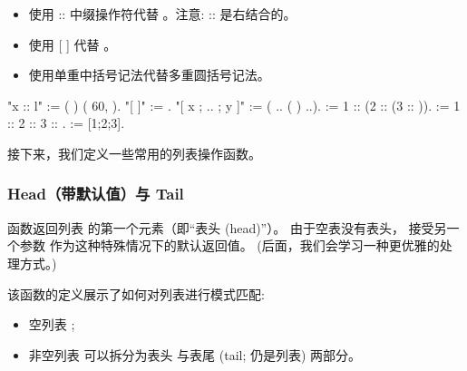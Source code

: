 \documentclass[12pt]{report}
\begin{document}
{{{\begin{itemize}
\item  使用 :: 中缀操作符代替 。注意: :: 是右结合的。

\item  使用 [ ] 代替 。

\item  使用单重中括号记法代替多重圆括号记法。

\end{itemize}
\begin{coqdoccode}
\coqdocemptyline
\coqdocnoindent
{} "x :: l" := (  )\coqdoceol
\coqdocindent{10.50em}
(  60,  ).\coqdoceol
\coqdocnoindent
{} "[ ]" := .\coqdoceol
\coqdocnoindent
{} "[ x ; .. ; y ]" := (  .. (  ) ..).\coqdoceol
\coqdocemptyline
\coqdocnoindent
{}  := 1 :: (2 :: (3 :: )).\coqdoceol
\coqdocnoindent
{}  := 1 :: 2 :: 3 :: .\coqdoceol
\coqdocnoindent
{}  := [1;2;3].\coqdoceol
\coqdocemptyline
\end{coqdoccode}
  接下来，我们定义一些常用的列表操作函数。
\begin{coqdoccode}
\end{coqdoccode}
\subsubsection{Head（带默认值）与 Tail}





   函数返回列表  的第一个元素（即“表头 (head)”）。
  由于空表没有表头， 接受另一个参数  
  作为这种特殊情况下的默认返回值。
  (后面，我们会学习一种更优雅的处理方式。)


  该函数的定义展示了如何对列表进行模式匹配:

\begin{itemize}
\item  空列表 ;

\item  非空列表  可以拆分为表头 
    与表尾  (tail; 仍是列表) 两部分。


\end{itemize}}}}
\end{document}
